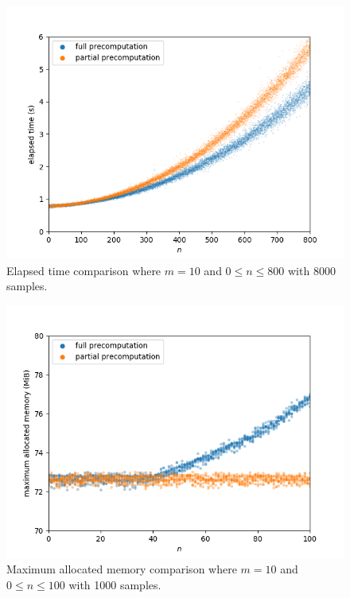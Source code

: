 \begin{figure}[H]
	\centering
	\includegraphics[scale=0.7]{figures/precomputation_cpu_big}
	\caption{Elapsed time comparison where $m=10$ and $0\leq n\leq 800$ with 8000 samples.}
\end{figure}

\begin{figure}[H]
	\centering
	\includegraphics[scale=0.7]{figures/precomputation_memory_small}
	\caption{Maximum allocated memory comparison where $m=10$ and $0\leq n\leq 100$ with 1000 samples.}
\end{figure}

